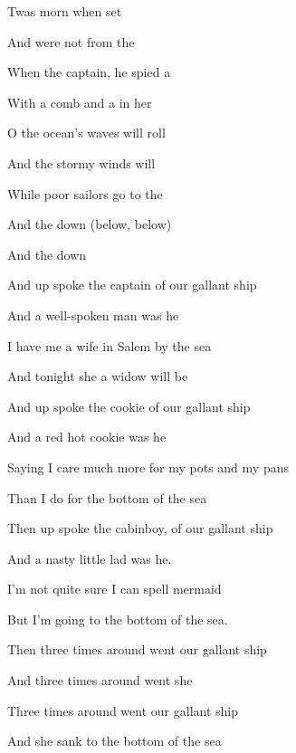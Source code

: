 \begin{SBVerse*}
Twas  morn when  set 

And  were not  from the 

When the captain, he spied a  

With a comb and a  in her 
\end{SBVerse*}

\bigskip

\begin{SBChorus}
O the ocean's waves will roll

And the stormy winds will 

While  poor sailors go  to the 

And the   down  (below, below)

And the   down 
\end{SBChorus}

\bigskip

And up spoke the captain of our gallant ship

And a well-spoken man was he

I have me a wife in Salem by the sea

And tonight she a widow will be

\bigskip

And up spoke the cookie of our gallant ship

And a red hot cookie was he

Saying I care much more for my pots and my pans

Than I do for the bottom of the sea

\bigskip

Then up spoke the cabinboy, of our gallant ship

And a nasty little lad was he.

I'm not quite sure I can spell \og mermaid \fg

But I'm going to the bottom of the sea.

\bigskip

Then three times around went our gallant ship

And three times around went she

Three times around went our gallant ship

And she sank to the bottom of the sea




